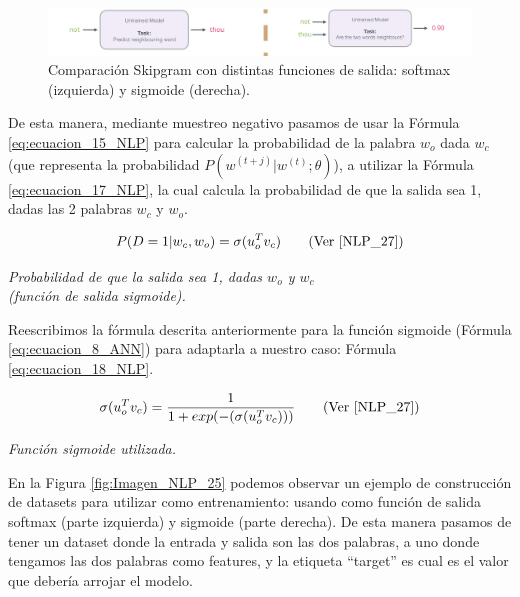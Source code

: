 \documentclass[12pt,a4paper]{article}
\begin{document}
\begin{sloppypar}
\begin{figure}[H]    
 \centering
 \includegraphics[width=1\textwidth]{images/NLP/24.png}
 \captionsetup{justification=centering,margin=2cm}
 \caption{Comparación Skipgram con distintas funciones de salida: softmax (izquierda) y sigmoide (derecha)\cite{datitos_nlp}.}
 \label{fig:Imagen_NLP_24}
\end{figure}

De esta manera, mediante muestreo negativo pasamos de usar la Fórmula \ref{eq:ecuacion_15_NLP} para calcular la probabilidad de la palabra $w_o$ dada $w_c$ (que representa la probabilidad $P(w^{(t+j)} | w^{(t)}; \theta)$), a utilizar la Fórmula \ref{eq:ecuacion_17_NLP}, la cual calcula la probabilidad de que la salida sea 1, dadas las 2 palabras $w_c$ y $w_o$. 

\begin{equation}\label{eq:ecuacion_17_NLP}
P(D=1 | w_c, w_o) = \sigma (u_{o}^{T} v_c)    \qquad \text{(Ver \cite{NLP_27})}
\end{equation}
\begin{center}
\textit{Probabilidad de que la salida sea 1, dadas $w_o$ y $w_c$  \\ (función de salida sigmoide).}
\end{center}

Reescribimos la fórmula descrita anteriormente para la función sigmoide (Fórmula \ref{eq:ecuacion_8_ANN}) para adaptarla a nuestro caso: Fórmula \ref{eq:ecuacion_18_NLP}.

\begin{equation}\label{eq:ecuacion_18_NLP}
\sigma (u_{o}^{T} v_c) = \frac{1}{1 + exp(- (\sigma (u_{o}^{T} v_c)) )}    \qquad \text{(Ver \cite{NLP_27})}
\end{equation}
\begin{center}
\textit{Función sigmoide utilizada.}
\end{center}

En la Figura \ref{fig:Imagen_NLP_25} podemos observar un ejemplo de construcción de datasets para utilizar como entrenamiento: usando como función de salida softmax (parte izquierda) y sigmoide (parte derecha). De esta manera pasamos de tener un dataset donde la entrada y salida son las dos palabras, a uno donde tengamos las dos palabras como features, y la etiqueta “target” es cual es el valor que debería arrojar el modelo.


\end{sloppypar}
\end{document}
